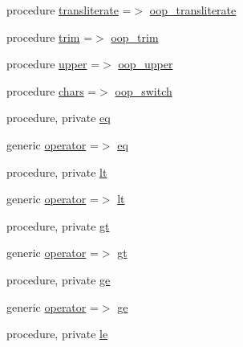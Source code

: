 \begin{DoxyCompactItemize}
procedure \hyperlink{structm__strings__oop_1_1string_a173ad4fc8d1678de6bb296c1c41eaf1f}{transliterate} =$>$ \hyperlink{namespacem__strings__oop_ac88f27671dd1129023494bf2500ca7fd}{oop\+\_\+transliterate}
\item 
procedure \hyperlink{structm__strings__oop_1_1string_a761cabaa770f1eb3311e9ceedeac4a24}{trim} =$>$ \hyperlink{namespacem__strings__oop_ab9238801d6c3af2fe7ee81c8d2c514ff}{oop\+\_\+trim}
\item 
procedure \hyperlink{structm__strings__oop_1_1string_ac4852f9fcb37135cfb6d368cc6cef2fe}{upper} =$>$ \hyperlink{namespacem__strings__oop_a9f4030a1ab2c7e2aa71b9d1f2754e67e}{oop\+\_\+upper}
\item 
procedure \hyperlink{structm__strings__oop_1_1string_a84c1d60eaee6e6acc2dbee4bce6d64bb}{chars} =$>$ \hyperlink{namespacem__strings__oop_a31be80e67fa4829b5ac48c530bd58b7b}{oop\+\_\+switch}
\item 
procedure, private \hyperlink{structm__strings__oop_1_1string_a18b563c23c8c5eef4afdb2f5abbd4dea}{eq}
\item 
generic \hyperlink{structm__strings__oop_1_1string_ade49da8d352a6c0d69f5719a5a056d60}{operator} =$>$ \hyperlink{structm__strings__oop_1_1string_a18b563c23c8c5eef4afdb2f5abbd4dea}{eq}
\item 
procedure, private \hyperlink{structm__strings__oop_1_1string_aa76a0bd5d16d7c9e2d35055495ee59e6}{lt}
\item 
generic \hyperlink{structm__strings__oop_1_1string_a22c104099ad26ca065d7e0ddbfca7aeb}{operator} =$>$ \hyperlink{structm__strings__oop_1_1string_aa76a0bd5d16d7c9e2d35055495ee59e6}{lt}
\item 
procedure, private \hyperlink{structm__strings__oop_1_1string_ad32f6920070952a482fe9c771bd24ade}{gt}
\item 
generic \hyperlink{structm__strings__oop_1_1string_ae1b6295dd1d93cf270435c91fa29ce01}{operator} =$>$ \hyperlink{structm__strings__oop_1_1string_ad32f6920070952a482fe9c771bd24ade}{gt}
\item 
procedure, private \hyperlink{structm__strings__oop_1_1string_a92181b235662baf8acf9489585c2dd53}{ge}
\item 
generic \hyperlink{structm__strings__oop_1_1string_a0ec9416af2c9677346cebade8a22187f}{operator} =$>$ \hyperlink{structm__strings__oop_1_1string_a92181b235662baf8acf9489585c2dd53}{ge}
\item 
procedure, private \hyperlink{structm__strings__oop_1_1string_a1ce3592f3269bc49ddfffc4cb7dc735a}{le}
\item 

\end{DoxyCompactItemize}
